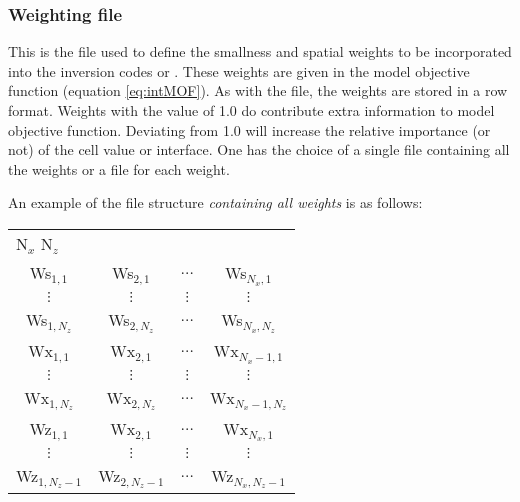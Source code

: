 \subsubsection{Weighting file}

This is the file used to define the smallness and spatial weights to be incorporated into the inversion codes  or . These weights are given in the model objective function (equation \ref{eq:intMOF}). As with the  file, the weights are stored in a row format. Weights with the value of 1.0 do contribute extra information to model objective function. Deviating from 1.0 will increase the relative importance (or not) of the cell value or interface. One has the choice of a single file containing all the weights or a file for each weight.

An example of the  file structure \textit{containing all weights} is as follows:

\begin{fileExample}
\begin{tabular}{|cccc|}
\hline
\multicolumn{4}{|l|}{N$_x$ N$_z$} \\
Ws$_{1,1}$ & Ws$_{2,1}$ & $\hdots$ & Ws$_{N_x,1}$ \\
$\vdots$ &  $\vdots$ &  $\vdots$ &  $\vdots$ \\
Ws$_{1,N_z}$ & Ws$_{2,N_z}$ & $\hdots$ & Ws$_{N_x,N_z}$ \\
Wx$_{1,1}$ & Wx$_{2,1}$ & $\hdots$ & Wx$_{N_x-1,1}$ \\
$\vdots$ &  $\vdots$ &  $\vdots$ &  $\vdots$ \\
Wx$_{1,N_z}$ & Wx$_{2,N_z}$ & $\hdots$ & Wx$_{N_x-1,N_z}$ \\
Wz$_{1,1}$ & Wx$_{2,1}$ & $\hdots$ & Wx$_{N_x,1}$ \\
$\vdots$ &  $\vdots$ &  $\vdots$ &  $\vdots$ \\
Wz$_{1,N_z-1}$ & Wz$_{2,N_z-1}$ & $\hdots$ & Wz$_{N_x,N_z-1}$ \\
\hline
\end{tabular}
\end{fileExample}

